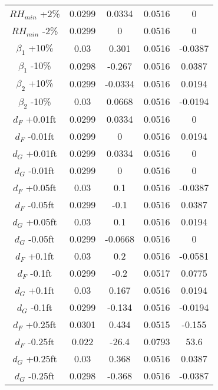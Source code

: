 \begin{linenumbers}
\begin{spacing}{1.0}
\begin{center}
\begin{longtable}{ccccc}
			$RH_{min} $ +2\% & 0.0299 & 0.0334 & 0.0516 & 0 \\
			$RH_{min} $ -2\% & 0.0299 & 0 & 0.0516 & 0 \\
			$\beta_{1} $ +10\% & 0.03 & 0.301 & 0.0516 & -0.0387 \\
			$\beta_{1} $ -10\% & 0.0298 & -0.267 & 0.0516 & 0.0387 \\
			$\beta_{2} $ +10\% & 0.0299 & -0.0334 & 0.0516 & 0.0194 \\
			$\beta_{2} $ -10\% & 0.03 & 0.0668 & 0.0516 & -0.0194 \\
			$d_{F} $ +0.01ft & 0.0299 & 0.0334 & 0.0516 & 0 \\
			$d_{F} $ -0.01ft & 0.0299 & 0 & 0.0516 & 0.0194 \\
			$d_{G} $ +0.01ft & 0.0299 & 0.0334 & 0.0516 & 0 \\
			$d_{G} $ -0.01ft & 0.0299 & 0 & 0.0516 & 0 \\
			$d_{F} $ +0.05ft & 0.03 & 0.1 & 0.0516 & -0.0387 \\
			$d_{F} $ -0.05ft & 0.0299 & -0.1 & 0.0516 & 0.0387 \\
			$d_{G} $ +0.05ft & 0.03 & 0.1 & 0.0516 & 0.0194 \\
			$d_{G} $ -0.05ft & 0.0299 & -0.0668 & 0.0516 & 0 \\
			$d_{F} $ +0.1ft & 0.03 & 0.2 & 0.0516 & -0.0581 \\
			$d_{F} $ -0.1ft & 0.0299 & -0.2 & 0.0517 & 0.0775 \\
			$d_{G} $ +0.1ft & 0.03 & 0.167 & 0.0516 & 0.0194 \\
			$d_{G} $ -0.1ft & 0.0299 & -0.134 & 0.0516 & -0.0194 \\
			$d_{F} $ +0.25ft & 0.0301 & 0.434 & 0.0515 & -0.155 \\
			$d_{F} $ -0.25ft & 0.022 & -26.4 & 0.0793 & 53.6 \\
			$d_{G} $ +0.25ft & 0.03 & 0.368 & 0.0516 & 0.0387 \\
			$d_{G} $ -0.25ft & 0.0298 & -0.368 & 0.0516 & -0.0387 \\
			\bottomrule
		\end{longtable}%
	\end{center}
\end{spacing}


\end{linenumbers}

